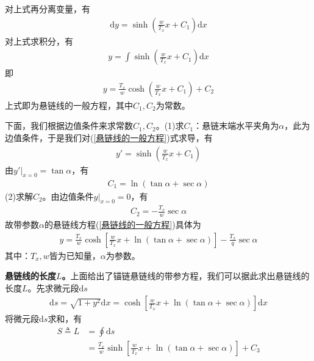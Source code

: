             对上式再分离变量，有
            \begin{align*}
            \mathrm{d}y = \sinh(\frac{w}{T_x}x+C_1)\mathrm{d}x
            \end{align*}
            对上式求积分，有
            \begin{align*}
            y = \int \sinh(\frac{w}{T_x}x+C_1)\mathrm{d}x
            \end{align*}
            即
            \begin{align}
            \label{悬链线的一般方程}
            y =\frac{T_x}{w}\cosh(\frac{w}{T_x}x+C_1)+C_2
            \end{align}
            上式即为悬链线的一般方程，其中$C_1,C_2$为常数。
            \par
            下面，我们根据边值条件来求常数$C_1,C_2$。(1)求$C_1$：悬链末端水平夹角为$\alpha$，此为边值条件，于是我们对(\ref{悬链线的一般方程})式求导，有
            \begin{align*}
            y' = \sinh(\frac{w}{T_x}x+C_1)
            \end{align*}
            由$y'|_{x=0}=\tan\alpha$，有
            \begin{align*}
            C_1 = \ln (\tan\alpha+\sec\alpha)
            \end{align*}
            (2)求解$C_2$。由边值条件$y|_{x=0}=0$，有
            \begin{align*}
            C_2 = -\frac{T_x}{w}\sec\alpha
            \end{align*}
            故带参数$\alpha$的悬链线方程(\ref{悬链线的一般方程})具体为
            \begin{align*}
            y = \frac{T_x}{w}\cosh\left[\frac{w}{T_x}x+\ln (\tan\alpha+\sec\alpha) \right]-\frac{T_x}{q}\sec\alpha
            \end{align*}
            其中：$T_x,w$皆为已知量，$\alpha$为参数。
            \par
            \textbf{悬链线的长度$L$。}上面给出了锚链悬链线的带参方程，我们可以据此求出悬链线的长度$L$。先求微元段$\mathrm{d}s$
            \begin{align*}
            \mathrm{d}s = \sqrt{1+y^2}\mathrm{d}x = \cosh\left[ \frac{w}{T_x}x+\ln (\tan\alpha+\sec\alpha) \right]\mathrm{d}x
            \end{align*}
            将微元段$\mathrm{d}s$求和，有
            \begin{align*}
            S \triangleq L &= \oint \mathrm{d}s\\
            &=\frac{T_x}{w}\sinh \left[\frac{w}{T_x}x+\ln (\tan\alpha+\sec\alpha)  \right]+C_3
            \end{align*}
